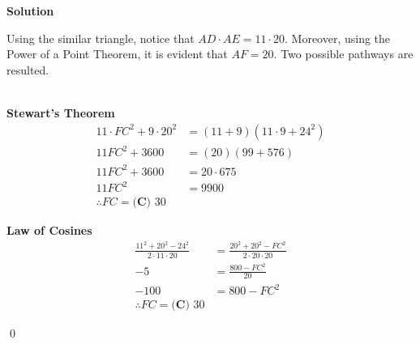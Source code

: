 \documentclass{article}
\newenvironment{solution}{\begin{trivlist}\item[]{\bf Solution}}{\qed \end{trivlist}}
\begin{document}
\begin{solution}
\begin{center}
\end{center}
Using the similar triangle, notice that $AD \cdot AE = 11 \cdot 20$. Moreover, using the Power of a Point Theorem, it is evident that $AF = 20$. Two possible pathways are resulted.
\\\\
\begin{minipage}{0.48\textwidth}
\textbf{Stewart's Theorem}
\begin{align*}
    11 \cdot FC^2 + 9 \cdot 20^2 &= (11 + 9)(11 \cdot 9 + 24^2) \\
    11FC^2 + 3600 &= (20)(99 + 576) \\
    11FC^2 + 3600 &= 20 \cdot 675 \\
    11FC^2 &= 9900 \\
    \therefore FC = \boxed{\textbf{(C) } 30}
\end{align*}
\end{minipage}
\hfill
\begin{minipage}{0.48\textwidth}
\textbf{Law of Cosines}
\begin{align*}
    \frac{11^2 + 20^2 - 24^2}{2 \cdot 11 \cdot 20} &= \frac{20^2 + 20^2 - FC^2}{2 \cdot 20 \cdot 20} \\
    -5 &= \frac{800 - FC^2}{20} \\
    -100 &= 800 - FC^2 \\
    \therefore FC = \boxed{\textbf{(C) } 30}
\end{align*}
\end{minipage}
\end{solution}

\newpage
\end{document}
